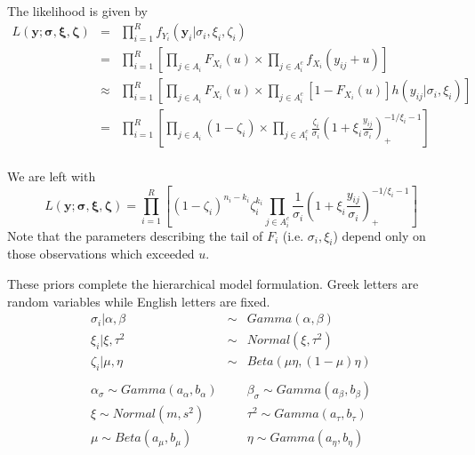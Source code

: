 \documentclass[12pt]{article}
\newcommand{\m}[1]{\mathbf{\bm{#1}}}
\begin{document}
\noindent The likelihood is given by
\begin{eqnarray*}
L(\m{y}; \m{\sigma}, \m{\xi}, \m{\zeta}) &=& \prod_{i=1}^R f_{Y_i}(\m{y}_i|\sigma_i,\xi_i,\zeta_i) \\
&=& \prod_{i=1}^R\left[\prod_{j\in A_i} F_{X_i}(u) \times \prod_{j\in A_i^c} f_{X_i}(y_{ij}+u)\right] \\
&\approx& \prod_{i=1}^R\left[\prod_{j\in A_i} F_{X_i}(u) \times \prod_{j\in A_i^c} [1-F_{X_i}(u)]h(y_{ij}|\sigma_i,\xi_i)\right] \\
&=& \prod_{i=1}^R\left[\prod_{j\in A_i} (1-\zeta_i)\times \prod_{j\in A_i^c} \frac{\zeta_i}{\sigma_i}\left(1+\xi_i\frac{y_{ij}}{\sigma_i}\right)_+^{-1/\xi_i-1}\right] \\
\end{eqnarray*}

\noindent We are left with
\[ L(\m{y}; \m{\sigma}, \m{\xi}, \m{\zeta}) = \prod_{i=1}^R\left[(1-\zeta_i)^{n_i-k_i}\zeta_i^{k_i}\prod_{j\in A_i^c}\frac{1}{\sigma_i}\left(1+\xi_i\frac{y_{ij}}{\sigma_i}\right)_+^{-1/\xi_i-1}\right] \]
\noindent Note that the parameters describing the tail of $F_i$ (i.e. $\sigma_i,\xi_i$) depend only on those observations which exceeded $u$.



\noindent These priors complete the hierarchical model formulation. Greek letters are random variables while English letters are fixed.
\begin{eqnarray*}
\sigma_i|\alpha, \beta &\sim& Gamma(\alpha, \beta) \\
\xi_i|\xi, \tau^2  &\sim& Normal(\xi, \tau^2) \\
\zeta_i|\mu, \eta &\sim& Beta(\mu\eta, (1-\mu)\eta) \\
 \\
\alpha_\sigma \sim Gamma(a_\alpha, b_\alpha)&  &\beta_\sigma \sim Gamma(a_\beta, b_\beta) \\
\xi \sim Normal(m, s^2)&  &\tau^2 \sim Gamma(a_\tau, b_\tau) \\
\mu \sim Beta(a_\mu, b_\mu)&  &\eta \sim Gamma(a_\eta, b_\eta) \\
\end{eqnarray*}
\end{document}
